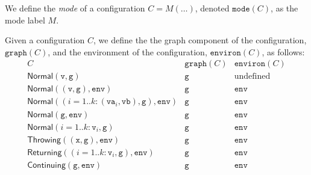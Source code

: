 \documentclass{book}
\newcommand\configmode[1]{\texttt{mode}({#1})}
\newcommand\graphof[1]{\texttt{graph}({#1})}
\newcommand\environof[1]{\texttt{environ}({#1})}
\newcommand\Normal[0]{\textsf{Normal}}
\newcommand\Throwing[0]{\textsf{Throwing}}
\newcommand\Continuing[0]{\textsf{Continuing}}
\newcommand\Returning[0]{\textsf{Returning}}
\newcommand\env[0]{\texttt{env}}
\newcommand\vg[0]{\texttt{g}}
\newcommand\vv[0]{\texttt{v}}
\newcommand\vx[0]{\texttt{x}}
\begin{document}
We define the \emph{mode} of a configuration $C=M(\ldots)$, denoted $\configmode{C}$, as the mode label $M$.

Given a configuration $C$, we define the the graph component of the configuration, $\graphof{C}$,
and the environment of the configuration, $\environof{C}$, as follows:
\[
\begin{array}{lcc}
  C & \graphof{C} & \environof{C}\\
  \hline
  \Normal(\vv,\vg) & \vg & \text{undefined}\\
  \Normal((\vv,\vg), \env) & \vg & \env\\
  \Normal((i=1..k: (\texttt{va}_i,\texttt{vb}),\vg), \env) & \vg & \env\\
  \Normal(\vg, \env) & \vg & \env\\
  \Normal(i=1..k: \vv_i, \vg) & \vg & \env\\
  \Throwing((\vx,\vg), \env) & \vg & \env\\
  \Returning((i=1..k: \vv_i,\vg), \env) & \vg & \env\\
  \Continuing(\vg, \env) & \vg & \env\\
\end{array}
\]
\end{document}

